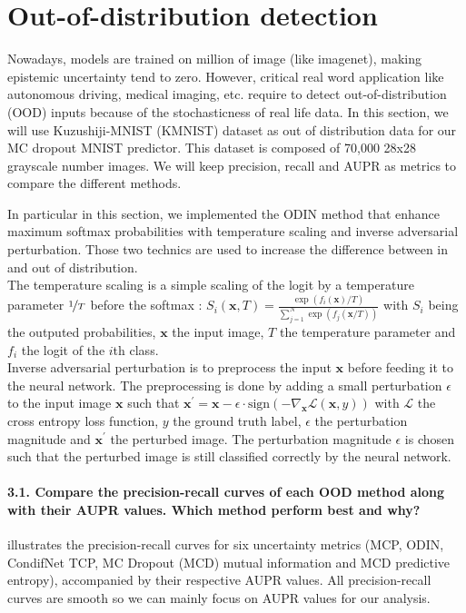 \section{Out-of-distribution detection}
Nowadays, models are trained on million of image (like imagenet), making epistemic uncertainty tend to zero. However, critical real word application like autonomous driving, medical imaging, etc. require to detect out-of-distribution (OOD) inputs because of the stochasticness of real life data. In this section, we will use Kuzushiji-MNIST (KMNIST) dataset as out of distribution data for our MC dropout MNIST predictor. This dataset is composed of 70,000 28x28 grayscale number images. We will keep precision, recall and AUPR as metrics to compare the different methods. 

In particular in this section, we implemented the ODIN method \citep{ODIN} that enhance maximum softmax probabilities with temperature scaling and inverse adversarial perturbation. Those two technics are used to increase the difference between in and out of distribution.\\
The temperature scaling is a simple scaling of the logit by a temperature parameter $ \nicefrac{1}{T} $ before the softmax : $ S_i(\boldsymbol{x}, T) = \frac{\exp (f_i(\boldsymbol{x}) / T)}{\sum_{j=1}^{N} \exp (f_j(\boldsymbol{x} / T))} $ with $ S_i $ being the outputed probabilities, $ \boldsymbol{x} $ the input image, $ T $ the temperature parameter and $ f_i $ the logit of the $ i $th class.\\
Inverse adversarial perturbation is to preprocess the input $ \boldsymbol{x} $ before feeding it to the neural network. The preprocessing is done by adding a small perturbation $ \epsilon $ to the input image $ \boldsymbol{x} $ such that $ \boldsymbol{x}^\prime = \boldsymbol{x} - \epsilon \cdot \text{sign}(-\nabla_{\boldsymbol{x}} \mathcal{L}(\boldsymbol{x}, y)) $ with $ \mathcal{L} $ the cross entropy loss function, $ y $ the ground truth label, $ \epsilon $ the perturbation magnitude and $ \boldsymbol{x}^\prime $ the perturbed image. The perturbation magnitude $ \epsilon $ is chosen such that the perturbed image is still classified correctly by the neural network.

\paragraph*{3.1. Compare the precision-recall curves of each OOD method along with their AUPR values. Which method perform best and why?}
 illustrates the precision-recall curves for six uncertainty metrics (MCP, ODIN, CondifNet TCP, MC Dropout (MCD) mutual information and MCD predictive entropy), accompanied by their respective AUPR values. All precision-recall curves are smooth so we can mainly focus on AUPR values for our analysis.

